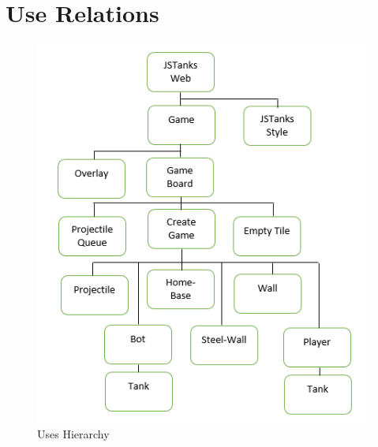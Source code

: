 \documentclass{article}
\begin{document}
\section{Use Relations}
\begin{figure}[H]
	\centering
	\includegraphics[width=\textwidth]{Uses_Hierarchy.png}
	\caption{Uses Hierarchy}
\end{figure}
\end{document}
